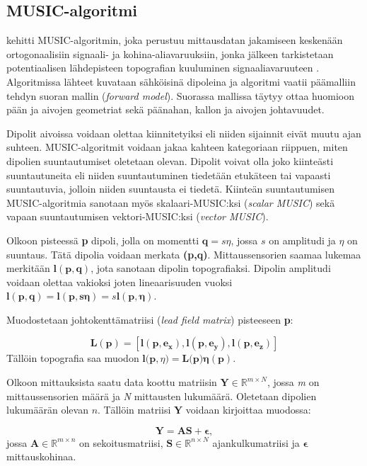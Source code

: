 \subsection{MUSIC-algoritmi}
\cite{Schmidt1986MultipleEstimation} kehitti MUSIC-algoritmin, joka perustuu mittausdatan jakamiseen keskenään ortogonaalisiin signaali- ja kohina-aliavaruuksiin, jonka jälkeen tarkistetaan potentiaalisen lähdepisteen topografian kuuluminen signaaliavaruuteen \citep{Mosher1999SourceMUSIC}. Algoritmissa lähteet kuvataan sähköisinä dipoleina ja algoritmi vaatii päämalliin tehdyn suoran mallin (\textit{forward model}). Suorassa mallissa täytyy ottaa huomioon pään ja aivojen geometriat sekä päänahan, kallon ja aivojen johtavuudet. \citep{hansen2010meg}

Dipolit aivoissa voidaan olettaa kiinnitetyiksi eli niiden sijainnit eivät muutu ajan suhteen. MUSIC-algoritmit voidaan jakaa kahteen kategoriaan riippuen, miten dipolien suuntautumiset oletetaan olevan. Dipolit voivat olla joko kiinteästi suuntautuneita eli niiden suuntautuminen tiedetään etukäteen tai vapaasti suuntautuvia, jolloin niiden suuntausta ei tiedetä. Kiinteän suuntautumisen MUSIC-algoritmia sanotaan myös skalaari-MUSIC:ksi (\textit{scalar MUSIC}) sekä vapaan suuntautumisen vektori-MUSIC:ksi (\textit{vector MUSIC}). \citep{Makela2018TruncatedLocalization}

Olkoon pisteessä \textbf{p} dipoli, jolla on momentti $\mathbf{q} = s\eta$, jossa $s$ on amplitudi ja $\eta$ on suuntaus. Tätä dipolia voidaan merkata \textbf{(p,q)}. Mittaussensorien saamaa lukemaa merkitään $\mathbf{l(p,q)}$, jota sanotaan dipolin topografiaksi. Dipolin amplitudi voidaan olettaa vakioksi joten lineaarisuuden vuoksi $\mathbf{l(p,q)} = \mathbf{l(p,s\eta)} = s\mathbf{l(p,\eta)}$.

Muodostetaan johtokenttämatriisi (\textit{lead field matrix}) pisteeseen \textbf{p}:

\begin{equation}
    \mathbf{L(p) = [l(p,e_x),l(p,e_y),l(p,e_z)]}
\end{equation}
Tällöin topografia saa muodon $\mathbf{l(p},\eta)=\mathbf{L(p})\mathbf{\eta}(\mathbf{p})$.

Olkoon mittauksista saatu data koottu matriisin $\mathbf{Y}\in \mathbb{R}^{m\times N}$, jossa \textit{m} on mittaussensorien määrä ja \textit{N} mittausten lukumäärä. Oletetaan dipolien lukumäärän olevan $n$. Tällöin matriisi $\mathbf{Y}$ voidaan kirjoittaa muodossa:

\begin{equation}
    \mathbf{Y=AS+\epsilon},
\end{equation}
jossa $\mathbf{A}\in \mathbb{R}^{m\times n}$ on sekoitusmatriisi, $\mathbf{S}\in \mathbb{R}^{n\times N}$ ajankulkumatriisi ja $\mathbf{\epsilon}$ mittauskohinaa.


